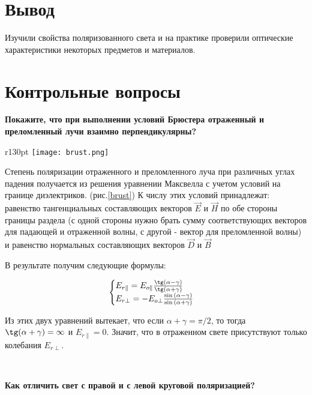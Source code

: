 \documentclass[12pt,a4paper]{article}
\begin{document}
\section{Вывод}
Изучили свойства поляризованного света и на практике проверили оптические характеристики некоторых предметов и материалов.

\newpage

\section{Контрольные вопросы}


\textbf{Покажите, что при выполнении условий Брюстера отраженный и преломленный лучи взаимно перпендикулярны?}

\begin{wrapfigure}[12]{r}{130pt}
\texttt{[image: brust.png]}
\caption{Закон Брюстера}
\label{brust}
\end{wrapfigure}

Степень поляризации отраженного и преломленного луча при различных углах падения получается из решения уравнении Максвелла с учетом условий на границе диэлектриков. (рис.\ref{brust})
К числу этих условий принадлежат: равенство тангенциальных составляющих векторов $\vec{E}$ и $\vec{H}$ по обе стороны границы раздела (с одной стороны нужно брать сумму соответствующих векторов для падающей и отраженной волны, с другой - вектор для преломленной волны) и равенство нормальных составляющих векторов $\vec{D}$ и $\vec{B}$

В результате получим следующие формулы:

\begin{center}
\begin{equation*}
\begin{cases}
   E_{r \|} = E_{o \|} \frac{\tg(\alpha - \gamma)}{\tg(\alpha + \gamma)} 
   \\
   E_{r \perp} = - E_{o\perp} \frac{\sin{(\alpha - \gamma)}}{\sin{(\alpha + \gamma)}}
\end{cases}
\end{equation*}
\end{center}

Из этих двух уравнений вытекает, что если $\alpha + \gamma = \pi/2$, то тогда $\tg(\alpha + \gamma) = \infty$ и $E_{r \|} = 0$. Значит, что в отраженном свете присутствуют только колебания $E_{r \perp}$. 


\


\textbf{Как отличить свет с правой и с левой круговой поляризацией?}
\end{document}
